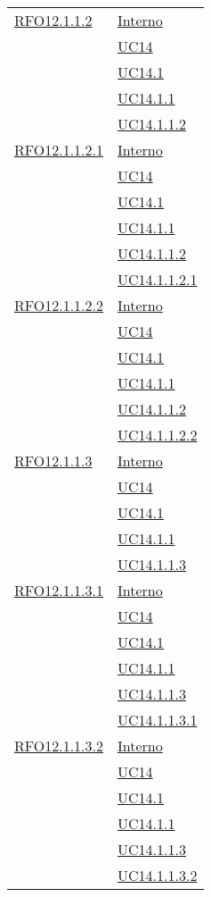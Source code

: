 \begin{longtable}{|>{\centering}m{5cm}|m{5cm}<{\centering}|}
 \hyperlink{RFO12.1.1.2}{RFO12.1.1.2} 
 & \hyperlink{Interno}{Interno}\\
& \hyperref[UC14]{UC14}\\
& \hyperref[UC14.1]{UC14.1}\\
& \hyperref[UC14.1.1]{UC14.1.1}\\
& \hyperref[UC14.1.1.2]{UC14.1.1.2}\\\hline

 \hyperlink{RFO12.1.1.2.1}{RFO12.1.1.2.1} 
 & \hyperlink{Interno}{Interno}\\
& \hyperref[UC14]{UC14}\\
& \hyperref[UC14.1]{UC14.1}\\
& \hyperref[UC14.1.1]{UC14.1.1}\\
& \hyperref[UC14.1.1.2]{UC14.1.1.2}\\
& \hyperref[UC14.1.1.2.1]{UC14.1.1.2.1}\\\hline

\hyperlink{RFO12.1.1.2.2}{RFO12.1.1.2.2} 
 & \hyperlink{Interno}{Interno}\\
& \hyperref[UC14]{UC14}\\
& \hyperref[UC14.1]{UC14.1}\\
& \hyperref[UC14.1.1]{UC14.1.1}\\
& \hyperref[UC14.1.1.2]{UC14.1.1.2}\\
& \hyperref[UC14.1.1.2.2]{UC14.1.1.2.2}\\\hline

 \hyperlink{RFO12.1.1.3}{RFO12.1.1.3} 
 & \hyperlink{Interno}{Interno}\\
& \hyperref[UC14]{UC14}\\
& \hyperref[UC14.1]{UC14.1}\\
& \hyperref[UC14.1.1]{UC14.1.1}\\
& \hyperref[UC14.1.1.3]{UC14.1.1.3}\\\hline

 \hyperlink{RFO12.1.1.3.1}{RFO12.1.1.3.1} 
 & \hyperlink{Interno}{Interno}\\
& \hyperref[UC14]{UC14}\\
& \hyperref[UC14.1]{UC14.1}\\
& \hyperref[UC14.1.1]{UC14.1.1}\\
& \hyperref[UC14.1.1.3]{UC14.1.1.3}\\
& \hyperref[UC14.1.1.3.1]{UC14.1.1.3.1}\\\hline

 \hyperlink{RFO12.1.1.3.2}{RFO12.1.1.3.2} 
 & \hyperlink{Interno}{Interno}\\
& \hyperref[UC14]{UC14}\\
& \hyperref[UC14.1]{UC14.1}\\
& \hyperref[UC14.1.1]{UC14.1.1}\\
& \hyperref[UC14.1.1.3]{UC14.1.1.3}\\
& \hyperref[UC14.1.1.3.2]{UC14.1.1.3.2}\\\hline


\end{longtable}
